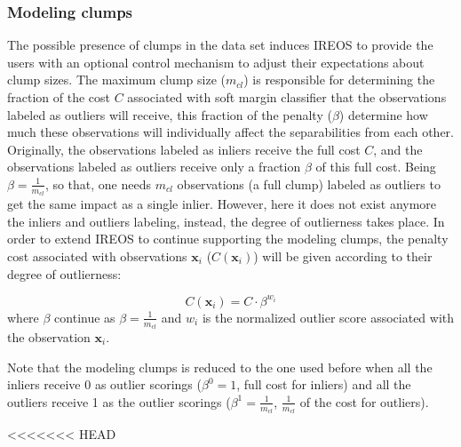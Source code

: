 \subsubsection{Modeling clumps}
The possible presence of clumps in the data set induces IREOS to provide the users with an optional control mechanism to adjust their expectations about clump sizes. The maximum clump size ($m_{cl}$) is responsible for determining the fraction of the cost $C$ associated with soft margin classifier that the observations labeled as outliers will receive, this fraction of the penalty ($\beta$) determine how much these observations will individually affect the separabilities from each other. Originally, the observations labeled as inliers receive the full cost $C$, and the observations labeled as outliers receive only a fraction $\beta$ of this full cost. Being $\beta = \frac{1}{m_{cl}}$, so that, one needs $m_{cl}$ observations (a full clump) labeled as outliers to get the same impact as a single inlier. However, here it does not exist anymore the inliers and outliers labeling, instead, the degree of outlierness takes place. In order to extend IREOS to continue supporting the modeling clumps, the penalty cost associated with observations $\mathbf{x}_i$ ($C(\mathbf{x}_i)$) will be given according to their degree of outlierness:

\begin{equation}
C(\mathbf{x}_i) = C \cdot \beta^{w_i}
\end{equation}
where $\beta$ continue as $\beta = \frac{1}{m_{cl}}$ and ${w_i}$ is the normalized outlier score associated with the observation $\mathbf{x}_i$. 

Note that the modeling clumps is reduced to the one used before when all the inliers receive 0 as outlier scorings ($\beta^0 = 1$, full cost for inliers) and all the outliers receive 1 as the outlier scorings ($\beta^1 = \frac{1}{m_{cl}}$, $\frac{1}{m_{cl}}$ of the cost for outliers).


<<<<<<< HEAD
